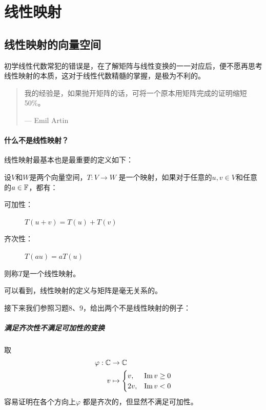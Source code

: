 \chapter{线性映射}
\section{线性映射的向量空间}
初学线性代数常犯的错误是，在了解矩阵与线性变换的一一对应后，便不愿再思考线性映射的本质，这对于线性代数精髓的掌握，是极为不利的。
\begin{quote}
    我的经验是，如果抛开矩阵的话，可将一个原本用矩阵完成的证明缩短 50\%。

    \hfill --- Emil Artin
\end{quote}
\subsubsection{什么不是线性映射？}
线性映射最基本也是最重要的定义如下：
\begin{definition}[线性映射]
    设\(V\)和\(W\)是两个向量空间，\(T: V \to W\) 是一个映射，如果对于任意的\(u,
    v \in V\)和任意的\(a \in \mathbb{F}\)，都有：
    \begin{description}
        \item[可加性：] \(T(u+v)=T(u)+T(v)\)
        \item[齐次性：] \(T(a u) = a T(u)\)
    \end{description}
    则称\(T\)是一个线性映射。
\end{definition}
可以看到，线性映射的定义与矩阵是毫无关系的。

接下来我们参照习题8、9，给出两个不是线性映射的例子：

\paragraph{满足齐次性不满足可加性的变换}
取
\begin{align*}
    \varphi: \mathbb{C} &\to \mathbb{C} \\
    v &\mapsto
    \begin{cases}
        v, &\operatorname{Im} v \geq 0 \\
        2v, &\operatorname{Im} v < 0
    \end{cases}
\end{align*}
容易证明在各个方向上\(\varphi\) 都是齐次的，但显然不满足可加性。


